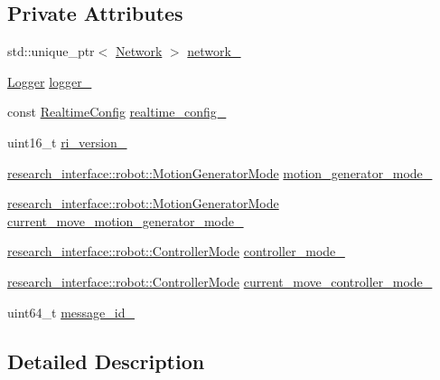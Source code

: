 \subsection*{Private Attributes}
\begin{DoxyCompactItemize}
\item 
std\+::unique\+\_\+ptr$<$ \hyperlink{classfranka_1_1Network}{Network} $>$ \hyperlink{classfranka_1_1Robot_1_1Impl_acecf3b158ccd1c2ed7e76971f1e6a192}{network\+\_\+}
\item 
\hyperlink{classfranka_1_1Logger}{Logger} \hyperlink{classfranka_1_1Robot_1_1Impl_a404078ee04a4786f61d991b71d2dc1ff}{logger\+\_\+}
\item 
const \hyperlink{namespacefranka_aeede4f4629390fea21ca5e5a35a8a943}{Realtime\+Config} \hyperlink{classfranka_1_1Robot_1_1Impl_af740b3f1aca49659f5d81501f3c83cad}{realtime\+\_\+config\+\_\+}
\item 
uint16\+\_\+t \hyperlink{classfranka_1_1Robot_1_1Impl_a9e5d9b45a15e1e23dd09e4d2fe272833}{ri\+\_\+version\+\_\+}
\item 
\hyperlink{namespaceresearch__interface_1_1robot_abd2451eb963a1843f1eb066ebd4b06e8}{research\+\_\+interface\+::robot\+::\+Motion\+Generator\+Mode} \hyperlink{classfranka_1_1Robot_1_1Impl_a209c353b4da1c85d3e633cab161a0d39}{motion\+\_\+generator\+\_\+mode\+\_\+}
\item 
\hyperlink{namespaceresearch__interface_1_1robot_abd2451eb963a1843f1eb066ebd4b06e8}{research\+\_\+interface\+::robot\+::\+Motion\+Generator\+Mode} \hyperlink{classfranka_1_1Robot_1_1Impl_a2fecb29212c55738e284b2ba8249ad5c}{current\+\_\+move\+\_\+motion\+\_\+generator\+\_\+mode\+\_\+}
\item 
\hyperlink{namespaceresearch__interface_1_1robot_a54ee0c8bfefd2ee8a46837ca6d2b1213}{research\+\_\+interface\+::robot\+::\+Controller\+Mode} \hyperlink{classfranka_1_1Robot_1_1Impl_aa435885c35275fc60b8de90832ae24df}{controller\+\_\+mode\+\_\+}
\item 
\hyperlink{namespaceresearch__interface_1_1robot_a54ee0c8bfefd2ee8a46837ca6d2b1213}{research\+\_\+interface\+::robot\+::\+Controller\+Mode} \hyperlink{classfranka_1_1Robot_1_1Impl_ab5d1a7e855dae2453635da08440c375e}{current\+\_\+move\+\_\+controller\+\_\+mode\+\_\+}
\item 
uint64\+\_\+t \hyperlink{classfranka_1_1Robot_1_1Impl_aed154fce2f3a44a60b7397405974d395}{message\+\_\+id\+\_\+}
\end{DoxyCompactItemize}


\subsection{Detailed Description}


